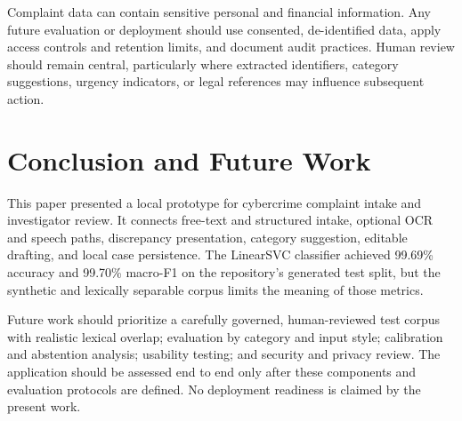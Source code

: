\documentclass[conference]{IEEEtran}
\begin{document}
Complaint data can contain sensitive personal and financial information. Any future evaluation or deployment should use consented, de-identified data, apply access controls and retention limits, and document audit practices. Human review should remain central, particularly where extracted identifiers, category suggestions, urgency indicators, or legal references may influence subsequent action.

\section{Conclusion and Future Work}
This paper presented a local prototype for cybercrime complaint intake and investigator review. It connects free-text and structured intake, optional OCR and speech paths, discrepancy presentation, category suggestion, editable drafting, and local case persistence. The LinearSVC classifier achieved 99.69\% accuracy and 99.70\% macro-F1 on the repository's generated test split, but the synthetic and lexically separable corpus limits the meaning of those metrics.

Future work should prioritize a carefully governed, human-reviewed test corpus with realistic lexical overlap; evaluation by category and input style; calibration and abstention analysis; usability testing; and security and privacy review. The application should be assessed end to end only after these components and evaluation protocols are defined. No deployment readiness is claimed by the present work.

\balance


\end{document}
